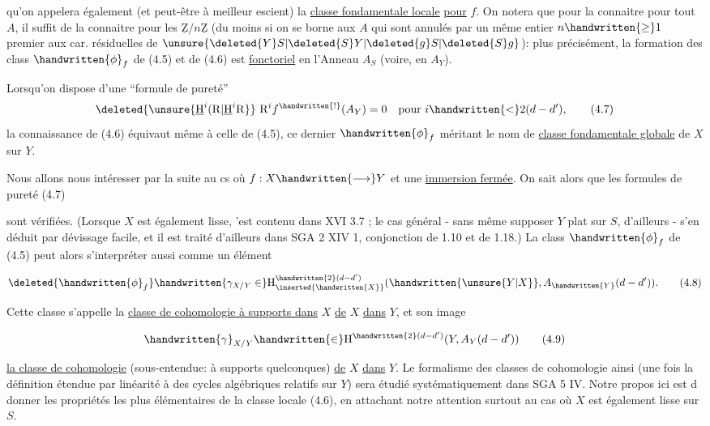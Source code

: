 qu'on appelera également (et peut-être à meilleur escient) la \uline{classe fondamentale locale} \uline{pour} $f$. On notera que pour la connaitre pour tout $A$, il suffit de la connaitre pour les $\underline{\mathrm{Z}}/n\underline{\mathrm{Z}}$ (du moins si on se borne aux $A$ qui sont annulés par un même entier $n\handwritten{\geq}1$ premier aux car. résiduelles de $\unsure{\deleted{Y}S|\deleted{S}Y|\deleted{g}S|\deleted{S}g}$):  plus précisément, la formation des class $\handwritten{\phi}_f$ de (4.5) et de (4.6) est \uline{fonctoriel} en l'Anneau $A_S$ (voire, en $A_Y$).

Lorsqu'on dispose d'une ``formule de pureté''
\[
\deleted{\unsure{\underline{\mathrm{H}}^i(\mathrm{R}|\underline{\mathrm{H}}^i\mathrm{R}}}\ \mathrm{R}^i f^{\handwritten{!}}(A_Y)=0\quad\text{pour }i\handwritten{<}2(d-d'),
\tag*{(4.7)}
\]
la connaissance de (4.6) équivaut même à celle de (4.5), ce dernier $\handwritten{\phi}_f$ méritant le nom de \uline{classe fondamentale globale} de $X$ sur $Y$.

Nous allons nous intéresser par la suite au cs où $f:X\handwritten{\longrightarrow}Y$ et une \uline{immersion fermée}. On sait alors que les formules de pureté (4.7)


sont vérifiées. (Lorsque $X$ est également lisse, 'est contenu dans XVI 3.7 ; le cas général - sans même supposer $Y$ plat sur $S$, d'ailleurs - s'en déduit par  dévissage facile, et il est traité d'ailleurs dans SGA 2 XIV 1, conjonction de 1.10 et de 1.18.) La class $\handwritten{\phi}_f$ de (4.5) peut alors s'interpréter aussi comme un élément 

\[
\deleted{\handwritten{\phi}_f}\handwritten{\gamma_{X/Y}\in}\mathrm{H}^{\handwritten{2}(d-d')}_{\inserted{\handwritten{X}}}(\handwritten{\unsure{Y|X}},A_{\handwritten{Y}}(d-d')).
\tag*{(4.8)}
\]

Cette classe s'appelle la \uline{classe de cohomologie à supports dans} $X$ \uline{de} $X$ \uline{dans} $Y$, et son image

\[
\handwritten{\gamma}_{X/Y}\handwritten{\in}\mathrm{H}^{\handwritten{2}(d-d')}(Y,A_Y(d-d'))
\tag*{(4.9)}
\]

\uline{la classe de cohomologie} (sous-entendue: à supports quelconques) \uline{de} $X$ \uline{dans} $Y$. Le formalisme des classes de cohomologie ainsi   (une fois la définition étendue par linéarité à des cycles algébriques relatifs sur $Y$) sera étudié systématiquement dans SGA 5 IV. Notre propos ici est d donner  les propriétés les plus élémentaires de la classe locale (4.6), en attachant notre attention surtout au cas où $X$ est également lisse sur $S$.


